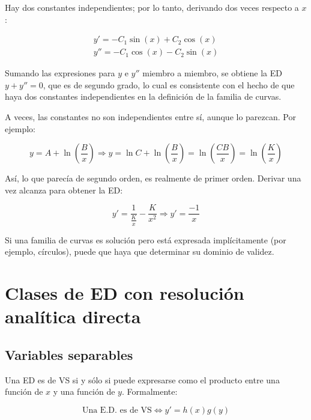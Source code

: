 \documentclass{article}
\begin{document}
Hay dos constantes independientes; por lo tanto, derivando dos veces respecto a $x$:

\begin{subequations}
\begin{align}
y' = -C_1 \sin(x) + C_2 \cos(x) \\
y'' = -C_1 \cos(x) - C_2 \sin(x)
\end{align}
\end{subequations}

Sumando las expresiones para $y$ e $y''$ miembro a miembro, se obtiene la ED $y + y'' = 0$, que es de segundo grado, lo cual es consistente con el hecho de que haya dos constantes independientes en la definición de la familia de curvas.

A veces, las constantes no son independientes entre sí, aunque lo parezcan. Por ejemplo:

\begin{equation}
y = A + \ln \left( \frac{B}{x} \right) \Rightarrow y = \ln C + \ln \left( \frac{B}{x} \right) = \ln \left( \frac{C B}{x} \right) = \ln \left( \frac{K}{x} \right)
\end{equation}

Así, lo que parecía de segundo orden, es realmente de primer orden. Derivar una vez alcanza para obtener la ED:

\begin{equation}
y' = \frac{1}{\frac{K}{x}} -\frac{K}{x^2} \Rightarrow y' = \frac{-1}{x}
\end{equation}

Si una familia de curvas es solución pero está expresada implícitamente (por ejemplo, círculos), puede que haya que determinar su dominio de validez.

\newpage

\section{Clases de ED con resolución analítica directa}

\subsection{Variables separables}

Una ED es de VS si y sólo si puede expresarse como el producto entre una función de $x$ y una función de $y$. Formalmente:

\begin{equation}
\text{Una E.D. es de VS} \Leftrightarrow y' = h(x) g(y)
\end{equation}
\end{document}

